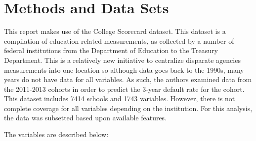 \documentclass[10pt,twocolumn]{article}
\begin{document}
\section{Methods and Data Sets}
This report makes use of the College Scorecard dataset. This dataset is a compilation
of education-related measurements, as collected by a number of federal institutions
from the Department of Education to the Treasury Department. This is a relatively new
initiative to centralize disparate agencies measurements into one location so
although data goes back to the 1990s, many years do not have data for all variables.
As such, the authors examined data from the 2011-2013 cohorts in order to predict the 3-year
default rate for the cohort. This dataset includes 7414 schools and 1743 variables.
However, there is not complete coverage for all variables depending on the
institution. For this analysis, the data was subsetted based upon available
features.

The variables are described below:
\end{document}

